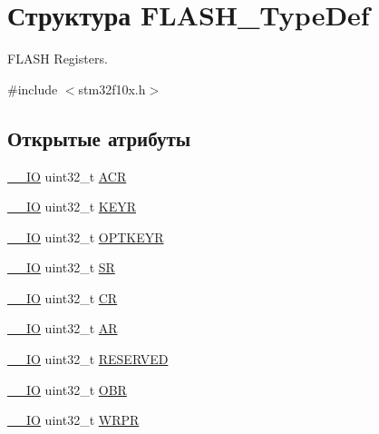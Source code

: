 \hypertarget{struct_f_l_a_s_h___type_def}{}\section{Структура F\+L\+A\+S\+H\+\_\+\+Type\+Def}
\label{struct_f_l_a_s_h___type_def}


F\+L\+A\+SH Registers.  




{\ttfamily \#include $<$stm32f10x.\+h$>$}

\subsection*{Открытые атрибуты}
\begin{DoxyCompactItemize}
\item 
\mbox{\hyperlink{group___c_m_s_i_s___c_m3__core__definitions_gaec43007d9998a0a0e01faede4133d6be}{\+\_\+\+\_\+\+IO}} uint32\+\_\+t \mbox{\hyperlink{struct_f_l_a_s_h___type_def_aaf432a8a8948613f4f66fcace5d2e5fe}{A\+CR}}
\item 
\mbox{\hyperlink{group___c_m_s_i_s___c_m3__core__definitions_gaec43007d9998a0a0e01faede4133d6be}{\+\_\+\+\_\+\+IO}} uint32\+\_\+t \mbox{\hyperlink{struct_f_l_a_s_h___type_def_a802e9a26a89b44decd2d32d97f729dd3}{K\+E\+YR}}
\item 
\mbox{\hyperlink{group___c_m_s_i_s___c_m3__core__definitions_gaec43007d9998a0a0e01faede4133d6be}{\+\_\+\+\_\+\+IO}} uint32\+\_\+t \mbox{\hyperlink{struct_f_l_a_s_h___type_def_a793cd13a4636c9785fdb99316f7fd7ab}{O\+P\+T\+K\+E\+YR}}
\item 
\mbox{\hyperlink{group___c_m_s_i_s___c_m3__core__definitions_gaec43007d9998a0a0e01faede4133d6be}{\+\_\+\+\_\+\+IO}} uint32\+\_\+t \mbox{\hyperlink{struct_f_l_a_s_h___type_def_a52c4943c64904227a559bf6f14ce4de6}{SR}}
\item 
\mbox{\hyperlink{group___c_m_s_i_s___c_m3__core__definitions_gaec43007d9998a0a0e01faede4133d6be}{\+\_\+\+\_\+\+IO}} uint32\+\_\+t \mbox{\hyperlink{struct_f_l_a_s_h___type_def_a7919306d0e032a855200420a57f884d7}{CR}}
\item 
\mbox{\hyperlink{group___c_m_s_i_s___c_m3__core__definitions_gaec43007d9998a0a0e01faede4133d6be}{\+\_\+\+\_\+\+IO}} uint32\+\_\+t \mbox{\hyperlink{struct_f_l_a_s_h___type_def_a9cd77bc29038841798b4b63c5cecdb9d}{AR}}
\item 
\mbox{\hyperlink{group___c_m_s_i_s___c_m3__core__definitions_gaec43007d9998a0a0e01faede4133d6be}{\+\_\+\+\_\+\+IO}} uint32\+\_\+t \mbox{\hyperlink{struct_f_l_a_s_h___type_def_a32e5cc660e711dc5424f827e2d4efd88}{R\+E\+S\+E\+R\+V\+ED}}
\item 
\mbox{\hyperlink{group___c_m_s_i_s___c_m3__core__definitions_gaec43007d9998a0a0e01faede4133d6be}{\+\_\+\+\_\+\+IO}} uint32\+\_\+t \mbox{\hyperlink{struct_f_l_a_s_h___type_def_a24dece1e3b3185456afe34c3dc6add2e}{O\+BR}}
\item 
\mbox{\hyperlink{group___c_m_s_i_s___c_m3__core__definitions_gaec43007d9998a0a0e01faede4133d6be}{\+\_\+\+\_\+\+IO}} uint32\+\_\+t \mbox{\hyperlink{struct_f_l_a_s_h___type_def_ac1889c0e17d868ab991f267ceb9dbb4b}{W\+R\+PR}}
\end{DoxyCompactItemize}


